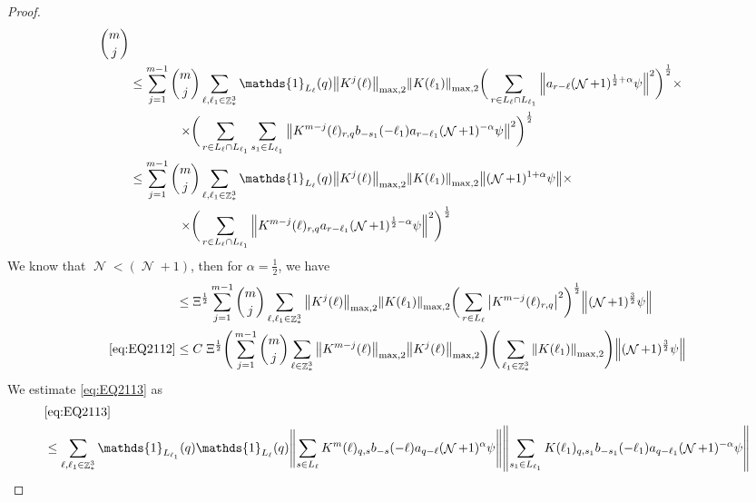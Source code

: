 \documentclass[sn-mathphys, Numbered ,a4paper]{sn-jnl}%
\DeclareMathOperator{\Z}{\mathbb{Z}}
\DeclareMathOperator{\NN}{\mathcal{N}}
\newcommand{\half}{\frac{1}{2}}
\newcommand{\normmaxii}[1]{\norm{#1}_{\mathrm{max,2}}}
\theoremstyle{plain}
\theoremstyle{definition}
\theoremstyle{remark}
\theoremstyle{plain}
\theoremstyle{definition}
\theoremstyle{remark}
\begin{document}
\begin{proof}
\begin{alignat}{2}
\begin{aligned}[t] {{m}\choose j}
    \end{aligned} \nonumber\\   
	&\leq \sum\limits_{j=1}^{m-1} \begin{aligned}[t]{{m}\choose j} &\sum\limits_{\ell,\ell_1 \in \Z^3_*} \mathds{1}_{L_{\ell}}(q) \normmaxii{K^j(\ell)} \normmaxii{K(\ell_1)} 
    \bigg( \sum\limits_{r\in L_{\ell} \cap L_{\ell_1}} \norm{ a_{r-\ell} (\NN+1)^{\half+\alpha}\psi}^2\bigg)^\half \times \nonumber\\ \times 
    \bigg( &\sum\limits_{r\in L_{\ell} \cap L_{\ell_1}} \sum\limits_{s_1 \in L_{\ell_1}}\norm{ K^{m-j}(\ell)_{r,q}  b_{-s_1}(-\ell_1)  a_{r-\ell_1} (\NN+1)^{-\alpha}\psi }^2\bigg)^\half
	\end{aligned} \nonumber\\
	&\leq \sum\limits_{j=1}^{m-1} \begin{aligned}[t]{{m}\choose j} &\sum\limits_{\ell,\ell_1 \in \Z^3_*} \mathds{1}_{L_{\ell}}(q) \normmaxii{K^j(\ell)} \normmaxii{K(\ell_1)}  
	 \norm{ (\NN+1)^{1+\alpha}\psi} \times \nonumber\\ \times 
	\bigg( &\sum\limits_{r\in L_{\ell}\cap L_{\ell_1}}  \norm{ K^{m-j}(\ell)_{r,q} a_{r-\ell_1} (\NN+1)^{\half-\alpha}\psi }^2\bigg)^\half \end{aligned} \nonumber\\
\end{alignat}
We know that $\NN<(\NN+1)$, then for $\alpha = \half$, we have
\begin{alignat}{2}
	&\leq \Xi^\half\sum\limits_{j=1}^{m-1} {{m}\choose j} \sum\limits_{\ell, \ell_1\in \Z^3_*} \normmaxii{K^j(\ell)} \normmaxii{K(\ell_1)} \bigg(\sum\limits_{r\in L_\ell}  \abs{ K^{m-j}(\ell)_{r,q} }^2\bigg)^\half \norm{(\NN+1)^\frac{3}{2} \psi}  \nonumber\\
  	\eqref{eq:EQ2112}&\leq C\;\Xi^\half \Bigg(\sum\limits_{j=1}^{m-1} {{m}\choose j} \sum\limits_{\ell \in \Z^3_*} \norm{K^{m-j}(\ell)}_{ \mathrm{max,2} } \norm{K^{j}(\ell)}_{\mathrm{max,2}}\Bigg) \Bigg(\sum\limits_{ \ell_1\in \Z^3_*} \norm{K(\ell_1)}_{\mathrm{max,2}}\Bigg)  \norm{(\NN+1)^{\frac{3}{2}} \psi} \label{eq:estEQ2112}
  \end{alignat} 
We estimate \eqref{eq:EQ2113} as
\begin{align}
	&\eqref{eq:EQ2113}\nonumber\\
	&\leq\sum\limits_{\ell, \ell_1\in \Z^3_*} \mathds{1}_{L_{\ell_1}}(q) \mathds{1}_{L_{\ell}}(q)  \norm{ \sum\limits_{s\in L_{\ell}} K^m(\ell)_{q,s} b_{-s}(-\ell) a_{q-\ell}(\NN+1)^{\alpha}\psi}\norm{ \sum\limits_{s_1 \in L_{\ell_1}} K(\ell_1)_{q,s_1} b_{-s_1}(-\ell_1)a_{q-\ell_1} (\NN+1)^{-\alpha} \psi }\nonumber\\

\end{align}
\end{proof}
\end{document}
